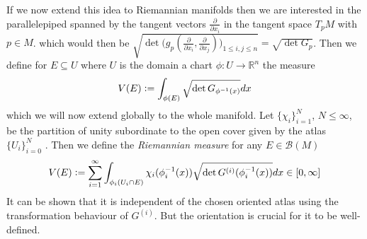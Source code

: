 \documentclass[12pt,a4paper]{article}
\numberwithin{equation}{subsection}
\numberwithin{lemma}{subsection}
\theoremstyle{definition}
\newcommand{\real}{\mathbb{R}}
\begin{document}
If we now extend this idea to Riemannian manifolds then we are interested 
in the parallelepiped spanned by the tangent vectors $\frac{\partial}{\partial x_i}$
in the tangent space $T_p M$ with $p \in M$.
which would then be $ \sqrt{\det \big( g_p(\frac{\partial}{\partial x_i}, 
\frac{\partial}{\partial x_j}) \big)_{1\leq i,j \leq n} } = 
\sqrt{ \det G_p }$. Then we define for $E \subseteq U$ where $U$ is 
the domain a chart $\phi: U \rightarrow \real^n$ the measure 
\begin{align*}
    V(E) \vcentcolon= \int_{\phi(E)} \sqrt{ \det G_{\phi^{-1}(x)}} dx 
\end{align*} 
which we will now extend globally to the whole manifold. 
Let $\{ \chi_i \}_{i=1}^N$, $N \leq \infty$, be the partition of unity 
subordinate to the open cover given by the atlas $\{U_i\}_{i = 0}^N$ . Then we define the 
\textit{Riemannian measure} for any $E \in \mathcal{B}(M)$
\begin{align*}
    V(E) \vcentcolon= \sum\limits_{i=1}^\infty \int_{\phi_i(U_i \cap E)}
        \chi_i(\phi_i^{-1}(x)) \sqrt{\det G^{(i)}(\phi_i^{-1}(x))} dx 
        \in [0,\infty]
\end{align*}
It can be shown that it is independent of the chosen oriented atlas 
using the transformation behaviour of $G^{(i)}$. But the orientation is 
crucial for it to be well-defined. 
\end{document}
